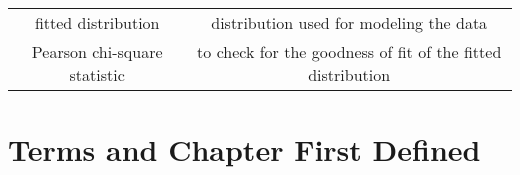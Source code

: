 \documentclass[]{book}
\theoremstyle{definition}
\theoremstyle{definition}
\theoremstyle{definition}
\theoremstyle{remark}
\begin{document}
\begin{longtable}[]{@{}cc@{}}
\begin{minipage}[t]{0.43\columnwidth}
fitted distribution\strut
\end{minipage} & \begin{minipage}[t]{0.43\columnwidth}\centering\strut
distribution used for modeling the data\strut
\end{minipage}\tabularnewline
\begin{minipage}[t]{0.43\columnwidth}\centering\strut
Pearson chi-square statistic\strut
\end{minipage} & \begin{minipage}[t]{0.43\columnwidth}\centering\strut
to check for the goodness of fit of the fitted distribution\strut
\end{minipage}\tabularnewline
\bottomrule
\end{longtable}

\chapter{Terms and Chapter First
Defined}\label{terms-and-chapter-first-defined}
\end{document}
